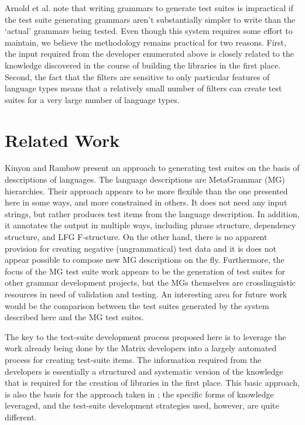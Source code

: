 \documentclass[11pt]{article}
\begin{document}
Arnold et al.  note that writing grammars to
generate test suites is impractical if the test suite generating
grammars aren't substantially simpler to write than the `actual'
grammars being tested.  Even though this system requires some effort
to maintain, we believe the methodology remains practical for two reasons. 
First, the input required from the developer enumerated above is
closely related to the knowledge discovered in the course of building
the libraries in the first place.  Second, the fact that the filters
are sensitive to only particular features of language types means that
a relatively small number of filters can create test suites for a very
large number of language types.

\section{Related Work}
\label{rw}
Kinyon and Rambow  present an approach to
generating test suites on the basis of descriptions of languages.  The
language descriptions are MetaGrammar (MG) hierarchies. Their approach
appears to be more flexible than the one presented here in some ways,
and more constrained in others.  It does not need any input strings,
but rather produces test items from the language description. In
addition, it annotates the output in multiple ways, including phrase
structure, dependency structure, and LFG F-structure.  On the other
hand, there is no apparent provision for creating negative
(ungrammatical) test data and it is does not appear possible to
compose new MG descriptions on the fly.  Furthermore, the focus of the
MG test suite work appears to be the generation of test suites for
other grammar development projects, but the MGs themselves are
crosslinguistic resources in need of validation and testing. An
interesting area for future work would be the comparison between the
test suites generated by the system described here and the MG test
suites.

The key to the test-suite development process proposed here is to
leverage the work already being done by the Matrix developers into a
largely automated process for creating test-suite items. The
information required from the developers is essentially a structured
and systematic version of the knowledge that is required for the
creation of libraries in the first place.  This basic
approach, is also the basis for the approach taken in
\cite{bro:00}; the specific forms of knowledge leveraged, and the
test-suite development strategies used, however, are quite different.
\end{document}
